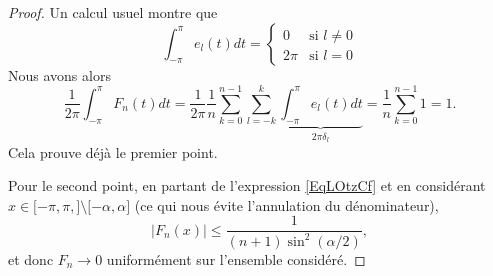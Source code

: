 \begin{proof}
    Un calcul usuel montre que
    \begin{equation}
        \int_{-\pi}^{\pi}e_l(t)dt=\begin{cases}
            0    &   \text{si } l\neq 0\\
            2\pi    &    \text{si } l=0
        \end{cases}
    \end{equation}
    Nous avons alors
    \begin{equation}
        \frac{1}{ 2\pi }\int_{-\pi}^{\pi}F_n(t)dt=\frac{1}{ 2\pi }\frac{1}{ n }\sum_{k=0}^{n-1}\sum_{l=-k}^k\underbrace{\int_{-\pi}^{\pi}e_l(t)dt}_{2\pi\delta_l}=\frac{1}{ n }\sum_{k=0}^{n-1}1=1.
    \end{equation}
    Cela prouve déjà le premier point.

    Pour le second point, en partant de l'expression \eqref{EqLOtzCf} et en considérant \( x\in\mathopen[ -\pi, \pi ,  \mathclose]\setminus\mathopen[ -\alpha , \alpha \mathclose]\) (ce qui nous évite l'annulation du dénominateur),
    \begin{equation}
        | F_n(x) |\leq\frac{1}{ (n+1)\sin^2(\alpha/2) },
    \end{equation}
    et donc \( F_n\to 0\) uniformément sur l'ensemble considéré.


\end{proof}
